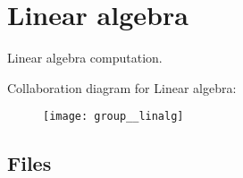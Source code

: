\hypertarget{group__linalg}{}\section{Linear algebra}
\label{group__linalg}


Linear algebra computation.  


Collaboration diagram for Linear algebra\+:\nopagebreak
\begin{figure}[H]
\begin{center}
\leavevmode
\texttt{[image: group\_\_linalg]}
\end{center}
\end{figure}
\subsection*{Files}
